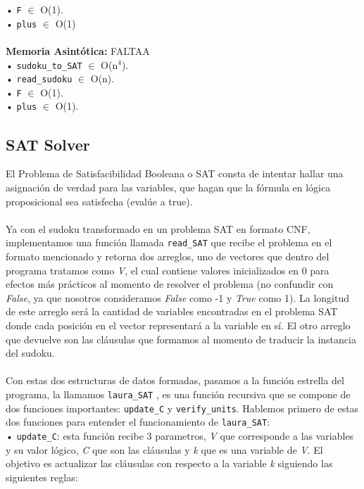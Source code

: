\documentclass[letterpaper,12pt]{article}
\begin{document}
• \texttt{F} $\in$ O(1).\\

• \texttt{plus} $\in$ O(1)\\
\\
\textbf{Memoria Asintótica:} FALTAA\\ 

• \texttt{sudoku\_to\_SAT} $\in$ O(n$^4$).\\

• \texttt{read\_sudoku} $\in$ O(n).\\

• \texttt{F} $\in$ O(1).\\

• \texttt{plus} $\in$ O(1).\\

\subsection{SAT Solver}

El Problema de Satisfacibilidad Booleana o SAT consta de intentar hallar una asignación de verdad para las variables, que hagan que la fórmula en lógica proposicional sea satisfecha (evalúe a true).\\
\\
Ya con el sudoku transformado en un problema SAT en formato CNF, implementamos una función llamada \texttt{read\_SAT} que recibe el problema en el formato mencionado y retorna dos arreglos, uno de vectores que dentro del programa tratamos como \textit{V}, el cual contiene valores inicializados en 0 para efectos más prácticos al momento de resolver el problema (no confundir con \textit{False}, ya que nosotros consideramos \textit{False} como -1 y \textit{True} como 1). La longitud de este arreglo será la cantidad de variables encontradas en el problema SAT donde cada posición en el vector representará a la variable en sí. El otro arreglo que devuelve son las cláusulas que formamos al momento de traducir la instancia del sudoku.\\
\\
Con estas dos estructuras de datos formadas, pasamos a la función estrella del programa, la llamamos \texttt{laura\_SAT} \Cooley, es una función recursiva que se compone de dos funciones importantes: \texttt{update\_C} y \texttt{verify\_units}. Hablemos primero de estas dos funciones para entender el funcionamiento de \texttt{laura\_SAT}:\\

• \texttt{update\_C}: esta función recibe 3 parametros, \textit{V} que corresponde a las variables y su valor lógico, \textit{C} que son las cláusulas y \textit{k} que es una variable de \textit{V}. El objetivo es actualizar las cláusulas con respecto a la variable \textit{k} siguiendo las siguientes reglas:\\
\end{document}
